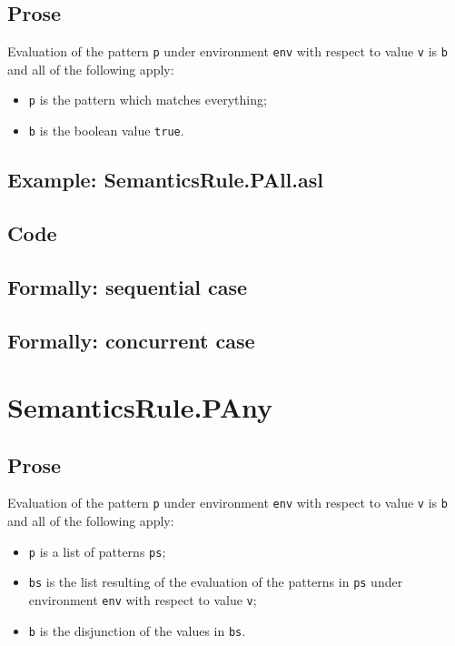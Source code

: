 \documentclass{book}
\begin{document}
  \subsection{Prose}
  Evaluation of the pattern \texttt{p} under environment \texttt{env} with
  respect to value \texttt{v} is \texttt{b} and all of the following apply:
  \begin{itemize}
  \item \texttt{p} is the pattern which matches everything;
  \item \texttt{b} is the boolean value \texttt{true}.
  \end{itemize}

  \subsection{Example: SemanticsRule.PAll.asl}

  \subsection{Code}

\begin{emptyformal}
  \subsection{Formally: sequential case}

  \subsection{Formally: concurrent case}
\end{emptyformal}


\section{SemanticsRule.PAny \label{sec:SemanticsRule.PAny}}

    \subsection{Prose}
  Evaluation of the pattern \texttt{p} under environment \texttt{env} with
  respect to value \texttt{v} is \texttt{b} and all of the following apply:
    \begin{itemize}
      \item \texttt{p} is a list of patterns \texttt{ps};
      \item \texttt{bs} is the list resulting of the evaluation of the patterns in \texttt{ps} under environment \texttt{env} with respect to value \texttt{v};
      \item \texttt{b} is the disjunction of the values in \texttt{bs}.
    \end{itemize}
\end{document}
